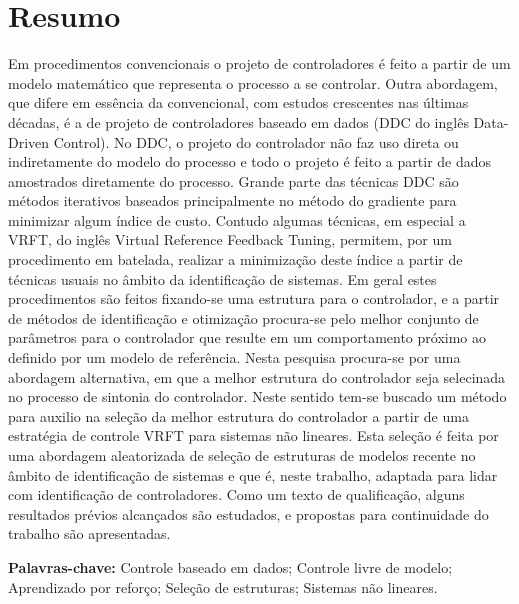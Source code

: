 
\chapter*{Resumo}

\vspace{-2cm} 


Em procedimentos convencionais o projeto de controladores é feito a partir de um modelo matemático que representa o processo a se controlar. Outra abordagem, que difere em essência da convencional, com estudos crescentes nas últimas décadas, é a de projeto de controladores baseado em dados (DDC do inglês Data-Driven Control). No DDC, o projeto do controlador não faz uso direta ou indiretamente do modelo do processo e todo o projeto é feito a partir de dados amostrados diretamente do processo. Grande parte das técnicas DDC são métodos iterativos baseados principalmente no método do gradiente para minimizar algum índice de custo. Contudo algumas técnicas, em especial a VRFT, do inglês Virtual Reference Feedback Tuning, permitem, por um procedimento em batelada, realizar a minimização deste índice a partir de técnicas usuais no âmbito da identificação de sistemas. Em geral estes procedimentos são feitos fixando-se uma estrutura para o controlador, e a partir de métodos de identificação e otimização procura-se pelo melhor conjunto de parâmetros para o controlador que resulte em um comportamento próximo ao definido por um modelo de referência. Nesta pesquisa procura-se por uma abordagem alternativa, em que a melhor estrutura do controlador seja selecinada no processo de sintonia do controlador.  Neste sentido tem-se buscado um método para auxilio na seleção da melhor estrutura do controlador a partir de uma estratégia de controle VRFT para sistemas não lineares. Esta seleção é feita por uma abordagem aleatorizada de seleção de estruturas de modelos recente no âmbito de identificação de sistemas e que é, neste trabalho, adaptada para lidar com identificação de controladores. Como um texto de qualificação, alguns resultados prévios alcançados são estudados, e propostas para continuidade do trabalho são apresentadas. 

\textbf{Palavras-chave:} Controle baseado em dados; Controle livre de modelo; Aprendizado por reforço; Seleção de estruturas; Sistemas não lineares.
